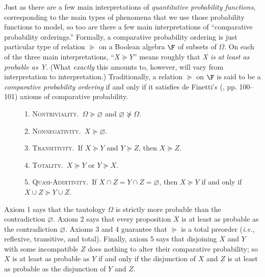 Just as there are a few main interpretations of \emph{quantitative probability functions}, corresponding to the main types of phenomena that we use those probability functions to model, so too are there a few main interpretations of ``comparative probability orderings.'' Formally, a comparative probability ordering is just particular type of relation $\succeq$ on a Boolean algebra $\F$ of subsets of $\Omega$. On each of the three main interpretations, ``$X\succeq Y$'' means roughly that \emph{X is at least as probable as Y}. (What \emph{exactly} this amounts to, however, will vary from interpretation to interpretation.) Traditionally, a relation $\succeq$ on $\F$ is said to be a \emph{comparative probability ordering} if and only if it satisfies de Finetti's (, pp. 100--101) axioms of comparative probability.
\begin{description}
\item[]1. \textsc{Nontriviality}.\, $\Omega\succeq \varnothing$ and $\varnothing\not\succeq \Omega$.
\item[]2. \textsc{Nonnegativity}.\, $X\succeq \varnothing$.
\item[]3. \textsc{Transitivity}.\, If $X\succeq Y$ and $Y\succeq Z$, then $X\succeq Z$.
\item[]4. \textsc{Totality}.\, $X\succeq Y$ or $Y\succeq X$.
\item[]5. \textsc{Quasi-Additivity}.\, If $X\cap Z=Y\cap Z=\varnothing$, then $X\succeq Y$ if and only if $X\cup Z\succeq Y\cup Z$.
\end{description}
Axiom 1 says that the tautology $\Omega$ is strictly more probable than the contradiction $\varnothing$. Axiom 2 says that every proposition $X$ is at least as probable as the contradiction $\varnothing$. Axioms 3 and 4 guarantee that $\succeq$ is a total preorder (\textit{i.e.}, reflexive, transitive, and total). Finally, axiom 5 says that disjoining $X$ and $Y$ with some incompatible $Z$ does nothing to alter their comparative probability; so $X$ is at least as probable as $Y$ if and only if the disjunction of $X$ and $Z$ is at least as probable as the disjunction of $Y$ and $Z$.

